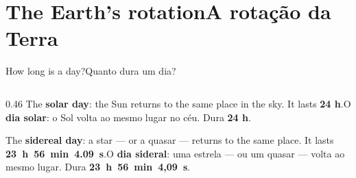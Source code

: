 \documentclass[aspectratio=169,11pt]{beamer}
\newcommand{\tr}[2]{\ifEN#2\else#1\fi}
\newcommand{\bnum}[1]{\textbf{\textcolor{mTeal}{#1}}}
\begin{document}
\section{\tr{A rotação da Terra}{The Earth's rotation}}

\begin{frame}{\tr{Quanto dura um dia?}{How long is a day?}}
  \begin{columns}[T]
    \begin{column}{0.46\textwidth}
      \small
      \tr{O \bnum{dia solar}: o Sol volta ao mesmo lugar no céu. Dura \bnum{24 h}.}{The \bnum{solar day}: the Sun returns to the same place in the sky. It lasts \bnum{24 h}.}
      \medskip

      \tr{O \bnum{dia sideral}: uma estrela --- ou um quasar --- volta ao mesmo lugar. Dura \bnum{\mbox{23 h 56 min 4,09 s}}.}{The \bnum{sidereal day}: a star --- or a quasar --- returns to the same place. It lasts \bnum{\mbox{23 h 56 min 4.09 s}}.}
      \medskip


\end{column}
\end{columns}
\end{frame}
\end{document}
